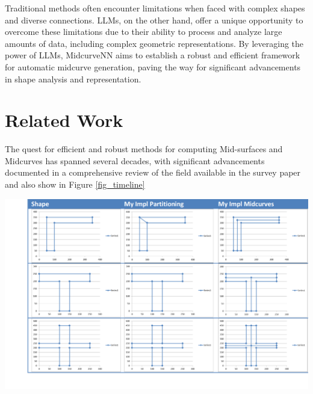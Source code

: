 \documentclass[conference]{IEEEtran}
\begin{document}
Traditional methods often encounter limitations when faced with complex shapes and diverse connections. LLMs, on the other hand, offer a unique opportunity to overcome these limitations due to their ability to process and analyze large amounts of data, including complex geometric representations. By leveraging the power of LLMs, MidcurveNN aims to establish a robust and efficient framework for automatic midcurve generation, paving the way for significant advancements in shape analysis and representation.

\section{Related Work}
\label{sec:2}

The quest for efficient and robust methods for computing Mid-surfaces and Midcurves has spanned several decades, with significant advancements documented in a comprehensive review of the field available in the survey paper \cite{medial2010} and also show in Figure \ref{fig_timeline}

     \begin{center}
	\includegraphics[width=0.8\linewidth]{images/midcurve16}
	\label{fig_timeline}
    \end{center}
    
\end{document}
